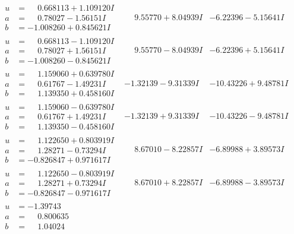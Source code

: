\documentclass[1p]{elsarticle_modified}
\theoremstyle{definition}
\begin{document}
$$\begin{array}{c|c|c}
\begin{aligned}
u &= \phantom{-}0.668113 + 1.109120 I \\
a &= \phantom{-}0.78027 - 1.56151 I \\
b &= -1.008260 + 0.845621 I\end{aligned}
 & \phantom{-}9.55770 + 8.04939 I & -6.22396 - 5.15641 I \\ \hline\begin{aligned}
u &= \phantom{-}0.668113 - 1.109120 I \\
a &= \phantom{-}0.78027 + 1.56151 I \\
b &= -1.008260 - 0.845621 I\end{aligned}
 & \phantom{-}9.55770 - 8.04939 I & -6.22396 + 5.15641 I \\ \hline\begin{aligned}
u &= \phantom{-}1.159060 + 0.639780 I \\
a &= \phantom{-}0.61767 - 1.49231 I \\
b &= \phantom{-}1.139350 + 0.458160 I\end{aligned}
 & -1.32139 - 9.31339 I & -10.43226 + 9.48781 I \\ \hline\begin{aligned}
u &= \phantom{-}1.159060 - 0.639780 I \\
a &= \phantom{-}0.61767 + 1.49231 I \\
b &= \phantom{-}1.139350 - 0.458160 I\end{aligned}
 & -1.32139 + 9.31339 I & -10.43226 - 9.48781 I \\ \hline\begin{aligned}
u &= \phantom{-}1.122650 + 0.803919 I \\
a &= \phantom{-}1.28271 - 0.73294 I \\
b &= -0.826847 + 0.971617 I\end{aligned}
 & \phantom{-}8.67010 - 8.22857 I & -6.89988 + 3.89573 I \\ \hline\begin{aligned}
u &= \phantom{-}1.122650 - 0.803919 I \\
a &= \phantom{-}1.28271 + 0.73294 I \\
b &= -0.826847 - 0.971617 I\end{aligned}
 & \phantom{-}8.67010 + 8.22857 I & -6.89988 - 3.89573 I \\ \hline\begin{aligned}
u &= -1.39743\phantom{ +0.000000I} \\
a &= \phantom{-}0.800635\phantom{ +0.000000I} \\
b &= \phantom{-}1.04024\phantom{ +0.000000I}\end{aligned}

\end{array}$$
\end{document}
